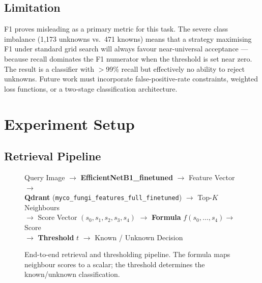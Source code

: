 \documentclass[11pt,a4paper]{article}
\begin{document}
\subsection{Limitation}

F1 proves misleading as a primary metric for this task. The severe class imbalance (1,173 unknowns vs.\ 471 knowns) means that a strategy maximising F1 under standard grid search will always favour near-universal acceptance --- because recall dominates the F1 numerator when the threshold is set near zero. The result is a classifier with $>$99\% recall but effectively no ability to reject unknowns. Future work must incorporate false-positive-rate constraints, weighted loss functions, or a two-stage classification architecture.


\section{Experiment Setup}

\subsection{Retrieval Pipeline}

\begin{figure}[htbp]
\centering
\begin{tcolorbox}[width=0.95\textwidth, colback=gray!5, colframe=gray!40, title={\textbf{Retrieval Pipeline Architecture}}, fonttitle=\bfseries]
\begin{center}
Query Image $\rightarrow$ \textbf{EfficientNetB1\_finetuned} $\rightarrow$ Feature Vector $\rightarrow$ \\
\textbf{Qdrant} (\texttt{myco\_fungi\_features\_full\_finetuned}) $\rightarrow$ Top-$K$ Neighbours \\
$\rightarrow$ Score Vector $(s_0, s_1, s_2, s_3, s_4)$ $\rightarrow$ \textbf{Formula} $f(s_0, \ldots, s_4) \rightarrow$ Score \\
$\rightarrow$ \textbf{Threshold} $t$ $\rightarrow$ Known / Unknown Decision
\end{center}
\end{tcolorbox}
\caption{End-to-end retrieval and thresholding pipeline. The formula maps neighbour scores to a scalar; the threshold determines the known/unknown classification.}
\label{fig:pipeline}
\end{figure}
\end{document}
